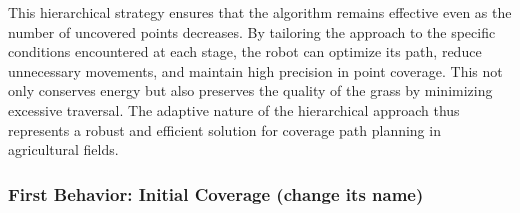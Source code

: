 \vspace*{6mm}   


This hierarchical strategy ensures that the algorithm remains effective even as the number of uncovered points decreases. By tailoring the approach to the specific conditions encountered at each stage, the robot can optimize its path, reduce unnecessary movements, and maintain high precision in point coverage. This not only conserves energy but also preserves the quality of the grass by minimizing excessive traversal. The adaptive nature of the hierarchical approach thus represents a robust and efficient solution for coverage path planning in agricultural fields.

\vspace*{6mm}  

\subsubsection{First Behavior: Initial Coverage (change its name)}






